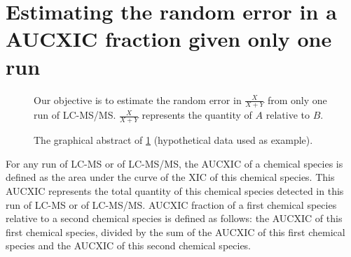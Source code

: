 
\glsunsetall
\chapter{Estimating the random error in a \texorpdfstring{\gls{AUCXIC}}{peak-area} fraction given only one run}
\label{chap:error}
\glsresetall

\begin{figure}[tpbh]
\small
\begin{framed}
\begin{center}
\end{center}
Our objective is to estimate the random error in \(\frac{X}{X+Y}\) from only one run of \gls{LC-MS/MS}.
\(\frac{X}{X+Y}\) represents the quantity of \(A\) relative to \(B\).
\end{framed}
\caption[
	The graphical abstract of \cref{chap:error}.]{
	The graphical abstract of \cref{chap:error} (hypothetical data used as example).
  \label{fig:error:graphical-abstract}}
\end{figure}
\clearpage

For any run of \gls{LC-MS} or of \gls{LC-MS/MS}, the \gls{AUCXIC} of a chemical species is defined as the area under the curve of the \gls{XIC} of this chemical species.
This \gls{AUCXIC} represents the total quantity of this chemical species detected in this run of \gls{LC-MS} or of \gls{LC-MS/MS}. 
\Gls{AUCXIC} fraction of a first chemical species relative to a second chemical species is defined as follows:
	the \gls{AUCXIC} of this first chemical species, divided by the sum of the \gls{AUCXIC} of this first chemical species and the \gls{AUCXIC} of this second chemical species.		

